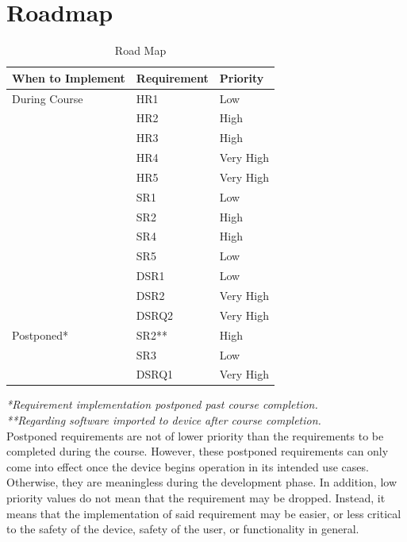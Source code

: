 \documentclass{article}
\begin{document}
\pagebreak
\section{Roadmap}
\begin{table}[H]
	\caption{Road Map} \label{RoadMap}
	\begin{tabularx}{\textwidth}{llX}
		\toprule
		\textbf{When to Implement} & \textbf{Requirement} & \textbf{Priority}        \\
		\midrule
		During Course         	& HR1               	& Low					\\
		         			& HR2              		& High 					\\
		          			& HR3                   	& High                   	     		\\
						& HR4 			& Very High 			 \\	
		          			& HR5                   	& Very High                   	     \\
		          			& SR1                   	& Low                   	     \\
		          			& SR2     			& High                   	     \\
		          			& SR4                   	& High                   	     \\
		          			& SR5                   	& Low                   	     \\
		          			& DSR1                   	& Low                   	     \\
		          			& DSR2                   	& Very High                   	     \\
		          			& DSRQ2                   & Very High                   	     \\
		Postponed*		& SR2** 			& High                               \\
						& SR3 			& Low                               \\
						& DSRQ1 			& Very High                               \\
		\bottomrule
	\end{tabularx}
\end{table}

\textit{*Requirement implementation postponed past course completion.}\\
\textit{**Regarding software imported to device after course completion.}\\

Postponed requirements are not of lower priority than the requirements to be completed during the course. However, these postponed requirements can only come into effect once the device begins operation in its intended use cases. Otherwise, they are meaningless during the development phase. In addition, low priority values do not mean that the requirement may be dropped. Instead, it means that the implementation of said requirement may be easier, or less critical to the safety of the device, safety of the user, or functionality in general.\\
\end{document}
